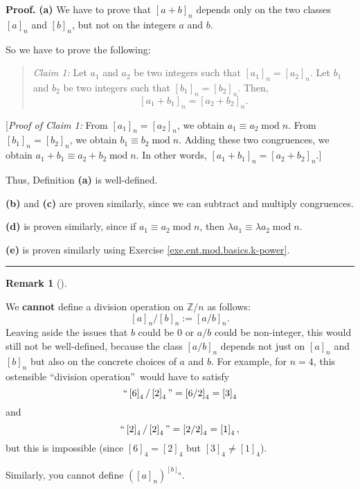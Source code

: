 \documentclass[numbers=enddot,12pt,final,onecolumn,notitlepage]{scrartcl}%
\numberwithin{exer}{subsection}
\theoremstyle{definition}
\newtheorem{remk}[theo]{Remark}
\newenvironment{remark}[1][]
{\begin{remk}[#1]\begin{leftbar}}
{\end{leftbar}\end{remk}}
\newenvironment{statement}{\begin{quote}}{\end{quote}}
\newenvironment{proof}[1][Proof]{\noindent\textbf{#1.} }{\ \rule{0.5em}{0.5em}}
\begin{document}
\begin{proof}
\textbf{(a)} We have to prove that $\left[  a+b\right]  _{n}$ depends only on
the two classes $\left[  a\right]  _{n}$ and $\left[  b\right]  _{n}$, but not
on the integers $a$ and $b$.

So we have to prove the following:

\begin{statement}
\textit{Claim 1:} Let $a_{1}$ and $a_{2}$ be two integers such that $\left[
a_{1}\right]  _{n}=\left[  a_{2}\right]  _{n}$. Let $b_{1}$ and $b_{2}$ be two
integers such that $\left[  b_{1}\right]  _{n}=\left[  b_{2}\right]  _{n}$.
Then,%
\[
\left[  a_{1}+b_{1}\right]  _{n}=\left[  a_{2}+b_{2}\right]  _{n}.
\]

\end{statement}

[\textit{Proof of Claim 1:} From $\left[  a_{1}\right]  _{n}=\left[
a_{2}\right]  _{n}$, we obtain $a_{1}\equiv a_{2}\operatorname{mod}n$. From
$\left[  b_{1}\right]  _{n}=\left[  b_{2}\right]  _{n}$, we obtain
$b_{1}\equiv b_{2}\operatorname{mod}n$. Adding these two congruences, we
obtain $a_{1}+b_{1}\equiv a_{2}+b_{2}\operatorname{mod}n$. In other words,
$\left[  a_{1}+b_{1}\right]  _{n}=\left[  a_{2}+b_{2}\right]  _{n}$.]

Thus, Definition \textbf{(a)} is well-defined.

\textbf{(b)} and \textbf{(c)} are proven similarly, since we can subtract and
multiply congruences.

\textbf{(d)} is proven similarly, since if $a_{1}\equiv a_{2}%
\operatorname{mod}n$, then $\lambda a_{1}\equiv\lambda a_{2}\operatorname{mod}%
n$.

\textbf{(e)} is proven similarly using Exercise
\ref{exe.ent.mod.basics.k-power}.
\end{proof}

\begin{remark}
We \textbf{cannot} define a division operation on $\mathbb{Z}/n$ as follows:%
\[
\left[  a\right]  _{n}/\left[  b\right]  _{n}:=\left[  a/b\right]  _{n}.
\]
Leaving aside the issues that $b$ could be $0$ or $a/b$ could be non-integer,
this would still not be well-defined, because the class $\left[  a/b\right]
_{n}$ depends not just on $\left[  a\right]  _{n}$ and $\left[  b\right]
_{n}$ but also on the concrete choices of $a$ and $b$. For example, for $n=4$,
this ostensible \textquotedblleft division operation\textquotedblright\ would
have to satisfy
\[
\text{\textquotedblleft}\left[  6\right]  _{4}/\left[  2\right]
_{4}\text{\textquotedblright}=\left[  6/2\right]  _{4}=\left[  3\right]  _{4}%
\]
and%
\[
\text{\textquotedblleft}\left[  2\right]  _{4}/\left[  2\right]
_{4}\text{\textquotedblright}=\left[  2/2\right]  _{4}=\left[  1\right]
_{4},
\]
but this is impossible (since $\left[  6\right]  _{4}=\left[  2\right]  _{4}$
but $\left[  3\right]  _{4}\neq\left[  1\right]  _{4}$).

Similarly, you cannot define $\left(  \left[  a\right]  _{n}\right)  ^{\left[
b\right]  _{n}}$.
\end{remark}
\end{document}
